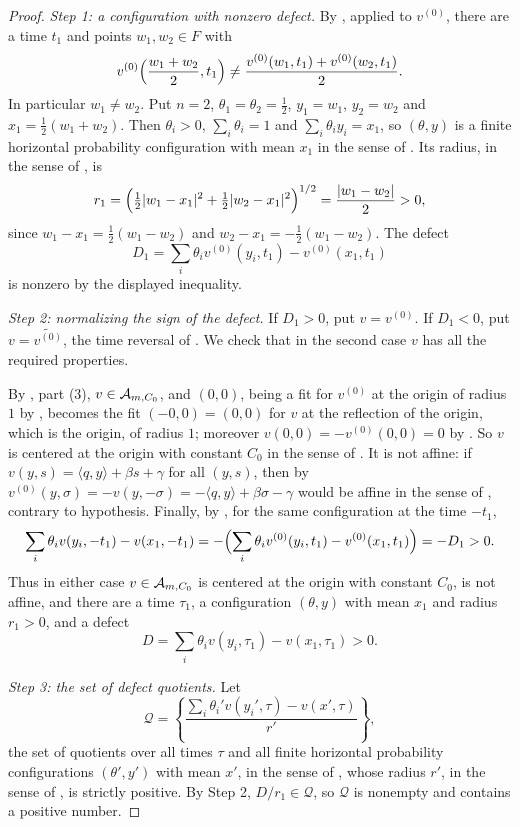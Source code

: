 \begin{proof}
\emph{Step 1: a configuration with nonzero defect.}
By , applied to $v^{(0)}$, there are a time $t_1$
and points $w_1,w_2\in F$ with
\[
  v^{(0)}\Bigl(\frac{w_1+w_2}{2},t_1\Bigr)
   \ne\frac{v^{(0)}(w_1,t_1)+v^{(0)}(w_2,t_1)}{2}.
\]
In particular $w_1\ne w_2$. Put $n=2$, $\theta_1=\theta_2=\tfrac12$,
$y_1=w_1$, $y_2=w_2$ and $x_1=\tfrac12(w_1+w_2)$. Then $\theta_i>0$,
$\sum_i\theta_i=1$ and $\sum_i\theta_iy_i=x_1$, so $(\theta,y)$ is a finite
horizontal probability configuration with mean $x_1$ in the sense of
. Its radius, in the sense of , is
\[
  r_1=\Bigl(\tfrac12|w_1-x_1|^2+\tfrac12|w_2-x_1|^2\Bigr)^{1/2}
   =\frac{|w_1-w_2|}{2}>0,
\]
since $w_1-x_1=\tfrac12(w_1-w_2)$ and $w_2-x_1=-\tfrac12(w_1-w_2)$. The defect
\[
  D_1=\sum_i\theta_iv^{(0)}(y_i,t_1)-v^{(0)}(x_1,t_1)
\]
is nonzero by the displayed inequality.

\emph{Step 2: normalizing the sign of the defect.}
If $D_1>0$, put $v=v^{(0)}$. If $D_1<0$, put $v=\widetilde{v^{(0)}}$, the time
reversal of . We check that in the second case $v$ has all the
required properties.

By , part (3), $v\in\mathcal{A}_{m,C_0}$, and $(0,0)$, being a
fit for $v^{(0)}$ at the origin of radius $1$ by , becomes
the fit $(-0,0)=(0,0)$ for $v$ at the reflection of the origin, which is the
origin, of radius $1$; moreover $v(0,0)=-v^{(0)}(0,0)=0$ by .
So $v$ is centered at the origin with constant $C_0$ in the sense of
. It is not affine: if $v(y,s)=\langle q,y\rangle+\beta
s+\gamma$ for all $(y,s)$, then by 
$v^{(0)}(y,\sigma)=-v(y,-\sigma)=-\langle q,y\rangle+\beta\sigma-\gamma$ would be
affine in the sense of , contrary to hypothesis.
Finally, by , for the same configuration at the time $-t_1$,
\[
  \sum_i\theta_iv(y_i,-t_1)-v(x_1,-t_1)
   =-\Bigl(\sum_i\theta_iv^{(0)}(y_i,t_1)-v^{(0)}(x_1,t_1)\Bigr)=-D_1>0 .
\]
Thus in either case $v\in\mathcal{A}_{m,C_0}$ is centered at the origin with
constant $C_0$, is not affine, and there are a time $\tau_1$, a configuration
$(\theta,y)$ with mean $x_1$ and radius $r_1>0$, and a defect
\[
  D=\sum_i\theta_iv(y_i,\tau_1)-v(x_1,\tau_1)>0 .
\]

\emph{Step 3: the set of defect quotients.}
Let
\[
  \mathcal Q=\left\{\frac{\sum_i\theta_i'v(y_i',\tau)-v(x',\tau)}{r'}\right\},
\]
the set of quotients over all times $\tau$ and all finite horizontal
probability configurations $(\theta',y')$ with mean $x'$, in the sense of
, whose radius $r'$, in the sense of ,
is strictly positive. By Step 2, $D/r_1\in\mathcal Q$, so $\mathcal Q$ is
nonempty and contains a positive number.


\end{proof}

